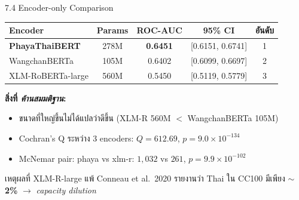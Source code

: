 \documentclass[aspectratio=169,11pt,xcolor=dvipsnames]{beamer}
\newcommand{\hl}[1]{\textcolor{kmitlOrange}{\textbf{#1}}}
\begin{document}
\begin{frame}{7.4 Encoder-only Comparison}
  \begin{center}
    \begin{tabular}{lcccc}
      \toprule
      \textbf{Encoder} & \textbf{Params} & \textbf{ROC-AUC} & \textbf{95\% CI} & \textbf{อันดับ}\\
      \midrule
      \hl{PhayaThaiBERT} & 278M & \textbf{0.6451} & [0.6151, 0.6741] & 1\\
      WangchanBERTa      & 105M & 0.6402 & [0.6099, 0.6697] & 2\\
      XLM-RoBERTa-large  & 560M & 0.5450 & [0.5119, 0.5779] & 3\\
      \bottomrule
    \end{tabular}
  \end{center}
  \vspace{0.5em}
  \textbf{สิ่งที่ \emph{ค้านสมมติฐาน}:}
  \begin{itemize}
    \item ขนาดที่ใหญ่ขึ้นไม่ได้แปลว่าดีขึ้น (XLM-R 560M $<$ WangchanBERTa 105M)
    \item Cochran's Q ระหว่าง 3 encoders: $Q = 612.69$, $p = 9.0 \times 10^{-134}$
    \item McNemar pair: phaya vs xlm-r: $1{,}032$ vs $261$, $p = 9.9 \times 10^{-102}$
  \end{itemize}
  \vspace{0.3em}
  \begin{block}{เหตุผลที่ XLM-R-large แพ้}
    Conneau et al.\ 2020 รายงานว่า Thai ใน CC100 มีเพียง \hl{$\sim$2\%} $\rightarrow$ \emph{capacity dilution}
  \end{block}
\end{frame}
\end{document}
